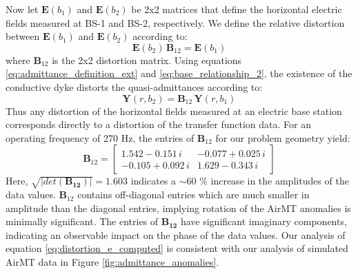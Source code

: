 \documentclass{segabs}
\begin{document}
Now let $\mathbf{E}(b_1)$ and $\mathbf{E}(b_2)$ be 2x2 matrices that define the horizontal electric fields measured at BS-1 and BS-2, respectively. We define the relative distortion between $\mathbf{E}(b_1)$ and $\mathbf{E}(b_2)$ according to:
\begin{equation}
\label{eq:base_relationship_2}
\mathbf{E}(b_2) \, \mathbf{B}_{12} = \mathbf{E}(b_1)
\end{equation}
where $\mathbf{B}_{12}$ is the 2x2 distortion matrix. Using equations \ref{eq:admittance_definition_ext} and \ref{eq:base_relationship_2}, the existence of the conductive dyke distorts the quasi-admittances according to:
\begin{equation}
\mathbf{Y}(r, b_2) = \mathbf{B}_{12} \, \mathbf{Y}(r, b_1)
\end{equation}
Thus any distortion of the horizontal fields measured at an electric base station corresponds directly to a distortion of the transfer function data. For an operating frequency of 270 Hz, the entries of $\mathbf{B}_{12}$ for our problem geometry yield:
\begin{equation}
\label{eq:distortion_e_computed}
\mathbf{B}_{12} = \begin{bmatrix}
1.542 - 0.151 \, i & -0.077 + 0.025 \, i \\
-0.105 + 0.092 \, i & 1.629 - 0.343 \, i
\end{bmatrix}
\end{equation}
Here, $\sqrt{|det(\mathbf{B_{12}})|} = 1.603$ indicates a $\sim$60 \% increase in the amplitudes of the data values. $\mathbf{B}_{12}$ contains off-diagonal entries which are much smaller in amplitude than the diagonal entries, implying rotation of the AirMT anomalies is minimally significant. The entries of $\mathbf{B_{12}}$ have significant imaginary components, indicating an observable impact on the phase of the data values. Our analysis of equation \ref{eq:distortion_e_computed} is consistent with our analysis of simulated AirMT data in Figure \ref{fig:admittance_anomalies}.
\end{document}
